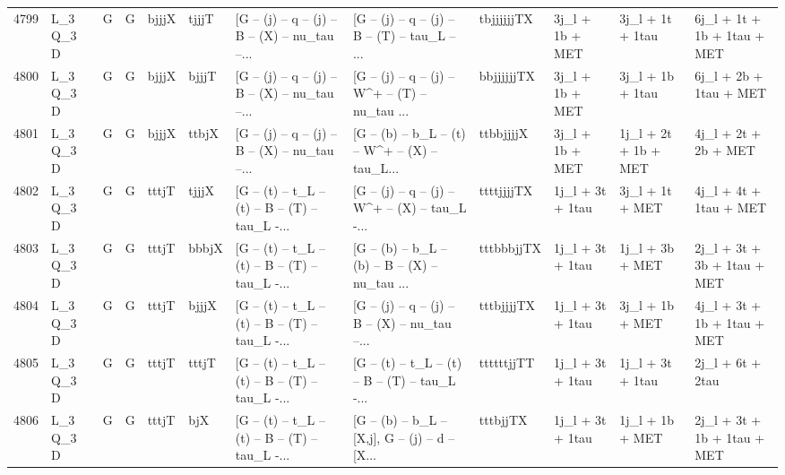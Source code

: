 \begin{tabular}{llllllllllll}
4799 &    L\_3 Q\_3 D &     G &     G &       bjjjX &       tjjjT &  [G -- (j) -- q -- (j) -- B -- (X) -- nu\_tau --... &  [G -- (j) -- q -- (j) -- B -- (T) -- tau\_L -- ... &  tbjjjjjjTX &          3j\_l + 1b + MET &         3j\_l + 1t + 1tau &        6j\_l + 1t + 1b + 1tau + MET \\
4800 &    L\_3 Q\_3 D &     G &     G &       bjjjX &       bjjjT &  [G -- (j) -- q -- (j) -- B -- (X) -- nu\_tau --... &  [G -- (j) -- q -- (j) -- W\textasciicircum + -- (T) -- nu\_tau ... &  bbjjjjjjTX &          3j\_l + 1b + MET &         3j\_l + 1b + 1tau &             6j\_l + 2b + 1tau + MET \\
4801 &    L\_3 Q\_3 D &     G &     G &       bjjjX &       ttbjX &  [G -- (j) -- q -- (j) -- B -- (X) -- nu\_tau --... &  [G -- (b) -- b\_L -- (t) -- W\textasciicircum + -- (X) -- tau\_L... &   ttbbjjjjX &          3j\_l + 1b + MET &     1j\_l + 2t + 1b + MET &               4j\_l + 2t + 2b + MET \\
4802 &    L\_3 Q\_3 D &     G &     G &       tttjT &       tjjjX &  [G -- (t) -- t\_L -- (t) -- B -- (T) -- tau\_L -... &  [G -- (j) -- q -- (j) -- W\textasciicircum + -- (X) -- tau\_L -... &  ttttjjjjTX &         1j\_l + 3t + 1tau &          3j\_l + 1t + MET &             4j\_l + 4t + 1tau + MET \\
4803 &    L\_3 Q\_3 D &     G &     G &       tttjT &       bbbjX &  [G -- (t) -- t\_L -- (t) -- B -- (T) -- tau\_L -... &  [G -- (b) -- b\_L -- (b) -- B -- (X) -- nu\_tau ... &  tttbbbjjTX &         1j\_l + 3t + 1tau &          1j\_l + 3b + MET &        2j\_l + 3t + 3b + 1tau + MET \\
4804 &    L\_3 Q\_3 D &     G &     G &       tttjT &       bjjjX &  [G -- (t) -- t\_L -- (t) -- B -- (T) -- tau\_L -... &  [G -- (j) -- q -- (j) -- B -- (X) -- nu\_tau --... &  tttbjjjjTX &         1j\_l + 3t + 1tau &          3j\_l + 1b + MET &        4j\_l + 3t + 1b + 1tau + MET \\
4805 &    L\_3 Q\_3 D &     G &     G &       tttjT &       tttjT &  [G -- (t) -- t\_L -- (t) -- B -- (T) -- tau\_L -... &  [G -- (t) -- t\_L -- (t) -- B -- (T) -- tau\_L -... &  ttttttjjTT &         1j\_l + 3t + 1tau &         1j\_l + 3t + 1tau &                   2j\_l + 6t + 2tau \\
4806 &    L\_3 Q\_3 D &     G &     G &       tttjT &         bjX &  [G -- (t) -- t\_L -- (t) -- B -- (T) -- tau\_L -... &  [G -- (b) -- b\_L -- [X,j], G -- (j) -- d -- [X... &    tttbjjTX &         1j\_l + 3t + 1tau &          1j\_l + 1b + MET &        2j\_l + 3t + 1b + 1tau + MET \\

\end{tabular}
